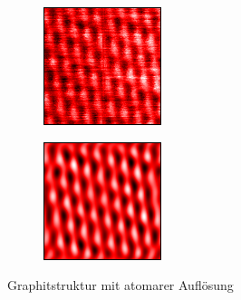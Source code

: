 \begin{figure}[h]
  \centering
  \begin{subfigure}[h]{0.5\textwidth}
    \centering
    \includegraphics{data/graphit/raw.png}
    \label{fig:raw}
  \end{subfigure}%
  \begin{subfigure}[h]{0.5\textwidth}
    \centering
    \includegraphics{data/graphit/2nm_edit2.png}
    \label{fig:edit}
  \end{subfigure}
  \caption{Graphitstruktur mit atomarer Auflösung}
\end{figure}

